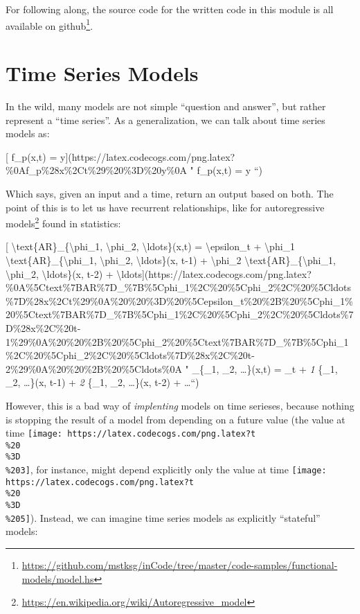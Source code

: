\documentclass[]{article}
\renewcommand{\href}[2]{#2\footnote{\url{#1}}}
\begin{document}
For following along, the source code for the written code in this module is all
available
\href{https://github.com/mstksg/inCode/tree/master/code-samples/functional-models/model.hs}{on
github}.

\hypertarget{time-series-models}{%
\section{Time Series Models}\label{time-series-models}}

In the wild, many models are not simple ``question and answer'', but rather
represent a ``time series''. As a generalization, we can talk about time series
models as:

{[} f\_p(x,t) =
y{]}(https://latex.codecogs.com/png.latex?\%0Af\_p\%28x\%2Ct\%29\%20\%3D\%20y\%0A
" f\_p(x,t) = y ``)

Which says, given an input and a time, return an output based on both. The point
of this is to let us have recurrent relationships, like for
\href{https://en.wikipedia.org/wiki/Autoregressive_model}{autoregressive models}
found in statistics:

{[} \textbackslash{}text\{AR\}\_\{\textbackslash{}phi\_1,
\textbackslash{}phi\_2, \textbackslash{}ldots\}(x,t) =
\textbackslash{}epsilon\_t + \textbackslash{}phi\_1
\textbackslash{}text\{AR\}\_\{\textbackslash{}phi\_1, \textbackslash{}phi\_2,
\textbackslash{}ldots\}(x, t-1) + \textbackslash{}phi\_2
\textbackslash{}text\{AR\}\_\{\textbackslash{}phi\_1, \textbackslash{}phi\_2,
\textbackslash{}ldots\}(x, t-2) +
\textbackslash{}ldots{]}(https://latex.codecogs.com/png.latex?\%0A\%5Ctext\%7BAR\%7D\_\%7B\%5Cphi\_1\%2C\%20\%5Cphi\_2\%2C\%20\%5Cldots\%7D\%28x\%2Ct\%29\%0A\%20\%20\%3D\%20\%5Cepsilon\_t\%20\%2B\%20\%5Cphi\_1\%20\%5Ctext\%7BAR\%7D\_\%7B\%5Cphi\_1\%2C\%20\%5Cphi\_2\%2C\%20\%5Cldots\%7D\%28x\%2C\%20t-1\%29\%0A\%20\%20\%2B\%20\%5Cphi\_2\%20\%5Ctext\%7BAR\%7D\_\%7B\%5Cphi\_1\%2C\%20\%5Cphi\_2\%2C\%20\%5Cldots\%7D\%28x\%2C\%20t-2\%29\%0A\%20\%20\%2B\%20\%5Cldots\%0A
" \_\{\phi\_1, \phi\_2, \ldots\}(x,t) = \epsilon\_t + \phi\emph{1
}\{\phi\_1, \phi\_2, \ldots\}(x, t-1) + \phi\emph{2
}\{\phi\_1, \phi\_2, \ldots\}(x, t-2) + \ldots ``)

However, this is a bad way of \emph{implenting} models on time serieses, because
nothing is stopping the result of a model from depending on a future value (the
value at time
\texttt{[image: https://latex.codecogs.com/png.latex?t\\\%20\\\%3D\\\%203]}, for
instance, might depend explicitly only the value at time
\texttt{[image: https://latex.codecogs.com/png.latex?t\\\%20\\\%3D\\\%205]}). Instead,
we can imagine time series models as explicitly ``stateful'' models:
\end{document}
